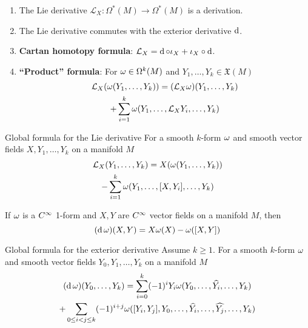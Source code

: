 \begin{theorem}{}{}
    \begin{enumerate}
        \item The Lie derivative \(\mathcal{L}_X \colon \Omega^*(M) \rightarrow \Omega^*(M)\) is a derivation.
        \item The Lie derivative commutes with the exterior derivative \(\operatorname{d}\).
        \item \textbf{Cartan homotopy formula}: \(\mathcal{L}_X = \operatorname{d} \circ \iota_X + \iota_X \circ \operatorname{d}\).
        \item \textbf{``Product'' formula}: For \(\omega \in \Omega^k(M)\) and \(Y_1, \dots, Y_k \in \mathfrak{X}(M)\) 
        \begin{multline}
            \mathcal{L}_X(\omega (Y_1, \dots, Y_k)) = (\mathcal{L}_X \omega)(Y_1, \dots, Y_k) \\ 
            + \sum_{i=1}^k \omega(Y_1, \dots, \mathcal{L}_X Y_i, \dots, Y_k)  
        \end{multline}
    \end{enumerate}
\end{theorem}
\begin{theorem}{Global formula for the Lie derivative}{}
    For a smooth \(k\)-form \(\omega\) and smooth vector fields \(X,Y_1, \dots, Y_k\) on a manifold \(M\)
    \begin{multline}
        \mathcal{L}_X(Y_1, \dots, Y_k) = X(\omega(Y_1, \dots, Y_k)) \\ 
        -  \sum_{i=1}^k \omega(Y_1, \dots, [X,Y_i], \dots, Y_k)  
    \end{multline}
\end{theorem}
\begin{proposition}{}{}
    If \(\omega\) is a \(C^\infty\) 1-form and \(X,Y\) are \(C^\infty\) vector fields on a manifold \(M\), then 
    \[
        (\operatorname{d} \omega)(X,Y) = X \omega(X) - \omega ([X,Y])
    \]
\end{proposition}
\begin{theorem}{Global formula for the exterior derivative}{}
    Assume \(k \geq 1\). 
    For a smooth \(k\)-form \(\omega\) and smooth vector fields \(Y_0, Y_1, \dots, Y_k\) on a manifold \(M\)
    \begin{multline*}
        (\operatorname{d} \omega)(Y_0, \dots, Y_k) = \sum_{i=0}^k (-1)^i Y_i \omega(Y_0, \dots, \widehat{Y_i}, \dots, Y_k) \\ 
        + \sum_{0 \leq i < j \leq k} (-1)^{i+j} \omega([Y_i, Y_j], Y_0, \dots, \widehat{Y_i}, \dots, \widehat{Y_j}, \dots, Y_k)
    \end{multline*}
\end{theorem}

